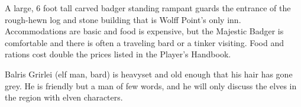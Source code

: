 A large, 6 foot tall carved badger standing rampant guards the entrance of the rough-hewn log and stone building that is Wolff Point's only inn.
Accommodations are basic and food is expensive, but the Majestic Badger is comfortable and there is often a traveling bard or a tinker visiting.
Food and rations cost double the prices listed in the Player's Handbook.

Balris Grirlei (elf man, bard) is heavyset and old enough that his hair has gone grey.
He is friendly but a man of few words, and he will only discuss the elves in the region with elven characters.
